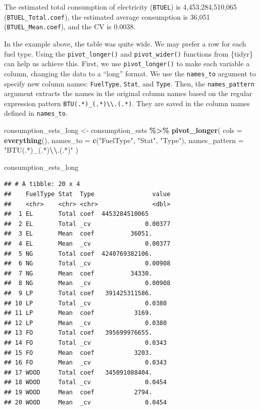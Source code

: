 \documentclass[
]{krantz}
\makeatletter
\newenvironment{Shaded}{\begin{snugshade}}{\end{snugshade}}
\newcommand{\AttributeTok}[1]{\textcolor[rgb]{0.27,0.27,0.27}{#1}}
\newcommand{\FunctionTok}[1]{\textcolor[rgb]{0.27,0.27,0.27}{\textbf{#1}}}
\newcommand{\NormalTok}[1]{#1}
\newcommand{\OtherTok}[1]{\textcolor[rgb]{0.37,0.37,0.37}{#1}}
\newcommand{\SpecialCharTok}[1]{\textcolor[rgb]{0.43,0.43,0.43}{\textbf{#1}}}
\newcommand{\StringTok}[1]{\textcolor[rgb]{0.5,0.5,0.5}{#1}}
\newenvironment{kframe}{%
\medskip{}
\setlength{\fboxsep}{.8em}
 \def\at@end@of@kframe{}%
 \ifinner\ifhmode%
  \def\at@end@of@kframe{\end{minipage}}%
  \begin{minipage}{\columnwidth}%
 \fi\fi%
 \def\FrameCommand##1{\hskip\@totalleftmargin \hskip-\fboxsep
 \colorbox{shadecolor}{##1}\hskip-\fboxsep
     \hskip-\linewidth \hskip-\@totalleftmargin \hskip\columnwidth}%
 \MakeFramed {\advance\hsize-\width
   \@totalleftmargin\z@ \linewidth\hsize
   \@setminipage}}%
 {\par\unskip\endMakeFramed%
 \at@end@of@kframe}
\renewenvironment{Shaded}{\begin{kframe}}{\end{kframe}}
\makeatother
\begin{document}
The estimated total consumption of electricity (\texttt{BTUEL}) is 4,453,284,510,065 (\texttt{BTUEL\_Total.coef}), the estimated average consumption is 36,051 (\texttt{BTUEL\_Mean.coef}), and the CV is 0.0038.

In the example above, the table was quite wide. We may prefer a row for each fuel type. Using the \texttt{pivot\_longer()} and \texttt{pivot\_wider()} functions from \{tidyr\} can help us achieve this. First, we use \texttt{pivot\_longer()} to make each variable a column, changing the data to a ``long'' format. We use the \texttt{names\_to} argument to specify new column names: \texttt{FuelType}, \texttt{Stat}, and \texttt{Type}. Then, the \texttt{names\_pattern} argument extracts the names in the original column names based on the regular expression pattern \texttt{BTU(.*)\_(.*)\textbackslash{}\textbackslash{}.(.*)}. They are saved in the column names defined in \texttt{names\_to}.

\begin{Shaded}
\begin{Highlighting}[]
\NormalTok{consumption\_ests\_long }\OtherTok{\textless{}{-}}\NormalTok{ consumption\_ests }\SpecialCharTok{\%\textgreater{}\%}
  \FunctionTok{pivot\_longer}\NormalTok{(}
    \AttributeTok{cols =} \FunctionTok{everything}\NormalTok{(),}
    \AttributeTok{names\_to =} \FunctionTok{c}\NormalTok{(}\StringTok{"FuelType"}\NormalTok{, }\StringTok{"Stat"}\NormalTok{, }\StringTok{"Type"}\NormalTok{),}
    \AttributeTok{names\_pattern =} \StringTok{"BTU(.*)\_(.*)}\SpecialCharTok{\textbackslash{}\textbackslash{}}\StringTok{.(.*)"}
\NormalTok{  )}

\NormalTok{consumption\_ests\_long}
\end{Highlighting}
\end{Shaded}

\begin{verbatim}
## # A tibble: 20 x 4
##    FuelType Stat  Type                value
##    <chr>    <chr> <chr>               <dbl>
##  1 EL       Total coef  4453284510065      
##  2 EL       Total _cv               0.00377
##  3 EL       Mean  coef          36051.     
##  4 EL       Mean  _cv               0.00377
##  5 NG       Total coef  4240769382106.     
##  6 NG       Total _cv               0.00908
##  7 NG       Mean  coef          34330.     
##  8 NG       Mean  _cv               0.00908
##  9 LP       Total coef   391425311586.     
## 10 LP       Total _cv               0.0380 
## 11 LP       Mean  coef           3169.     
## 12 LP       Mean  _cv               0.0380 
## 13 FO       Total coef   395699976655.     
## 14 FO       Total _cv               0.0343 
## 15 FO       Mean  coef           3203.     
## 16 FO       Mean  _cv               0.0343 
## 17 WOOD     Total coef   345091088404.     
## 18 WOOD     Total _cv               0.0454 
## 19 WOOD     Mean  coef           2794.     
## 20 WOOD     Mean  _cv               0.0454
\end{verbatim}
\end{document}
